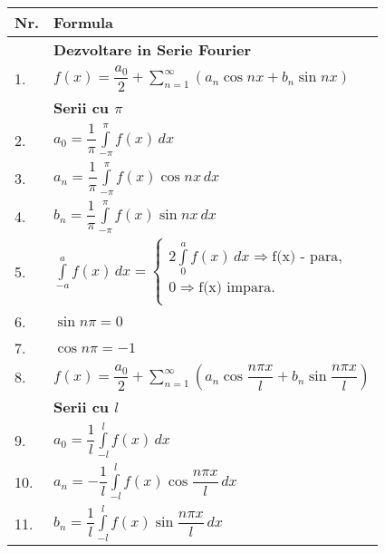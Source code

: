 \documentclass{article}
\begin{document}
\setlength{\extrarowheight}{10pt}

\begin{table}[!ht]
\begin{minipage}{0.5\linewidth}
\centering
\begin{tabular}{|m{1cm}|m{7cm}|}
\hline
\textbf{Nr.} & \textbf{Formula} \\
\hline
& \textbf{Dezvoltare in Serie Fourier} \\
\hline
1. & $ f(x) = \dfrac{a_0}{2} +\displaystyle\sum\limits_{n = 1}^{\infty} \left(a_n \cos nx + b_n \sin nx\right)  $\\
\hline
& \textbf{Serii cu $\pi$} \\
\hline
2. & $ a_0 = \dfrac{1}{\pi} \displaystyle\int\limits_{-\pi}^{\pi} f(x) \,dx $ \\
\hline
3. & $ a_n = \dfrac{1}{\pi} \displaystyle\int\limits_{-\pi}^{\pi} f(x) \cos nx \,dx $ \\
\hline
4. & $ b_n = \dfrac{1}{\pi} \displaystyle\int\limits_{-\pi}^{\pi} f(x) \sin nx \,dx $ \\
\hline
5. & $ \displaystyle\int\limits_{-a}^{a} f(x) \,dx =
\begin{cases}
    2\displaystyle\int\limits_{0}^{a} f(x) \,dx \Rightarrow \text{f(x) - para}, \\
    0 \Rightarrow \text{f(x)  impara}. \\
\end{cases}
$ \\
\hline
6. & $ \sin n\pi = 0 $ \\
\hline
7. & $ \cos n\pi = -1 $ \\
\hline
8. & $ f(x) = \dfrac{a_0}{2} + \displaystyle\sum\limits_{n = 1}^{\infty} \left(a_n \cos \dfrac{n\pi x}{l} + b_n \sin \dfrac{n\pi x}{l}\right) $ \\
\hline 
& \textbf{Serii cu $l$} \\
\hline
9. & $ a_0 = \dfrac{1}{l} \displaystyle\int\limits_{-l}^{l} f(x) \,dx$ \\
\hline
10. & $ a_n = -\dfrac{1}{l} \displaystyle\int\limits_{-l}^{l} f(x) \cos \dfrac{n\pi x}{l} \,dx$ \\
\hline
11. & $ b_n = \dfrac{1}{l} \displaystyle\int\limits_{-l}^{l} f(x) \sin \dfrac{n\pi x}{l} \,dx$ \\
\hline
\end{tabular}
\end{minipage}
\end{table}
\end{document}
